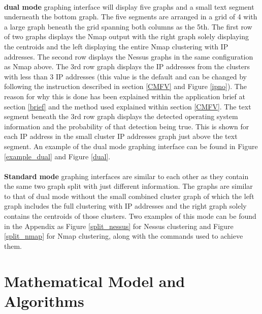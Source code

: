 \paragraph{}\textbf{dual mode} graphing interface will display five graphs and a small text segment underneath the bottom graph. The five segments are arranged in a grid of 4 with a large graph beneath the grid spanning both columns as the 5th. The first row of two graphs displays the Nmap output with the right graph solely displaying the centroids and the left displaying the entire Nmap clustering with IP addresses. The second row displays the Nessus graphs in the same configuration as Nmap above. The 3rd row graph displays the IP addresses from the clusters with less than 3 IP addresses (this value is the default and can be changed by following the instruction described in section \ref{CMFV} and Figure \ref{ipno}). The reason for why this is done has been explained within the application brief at section \ref{brief} and the method used explained within section \ref{CMFV}. The text segment beneath the 3rd row graph displays the detected operating system information and the probability of that detection being true. This is shown for each IP address in the small cluster IP addresses graph just above the text segment. An example of the dual mode graphing interface can be found in Figure \ref{example_dual} and Figure \ref{dual}.\linebreak
\paragraph{}\textbf{Standard mode} graphing interfaces are similar to each other as they contain the same two graph split with just different information. The graphs are similar to that of dual mode without the small combined cluster graph of which the left graph includes the full clustering with IP addresses and the right graph solely contains the centroids of those clusters. Two examples of this mode can be found in the Appendix as Figure \ref{split_nessus} for Nessus clustering and Figure \ref{split_nmap} for Nmap clustering, along with the commands used to achieve them. 



\section{Mathematical Model and Algorithms}
\label{models}

